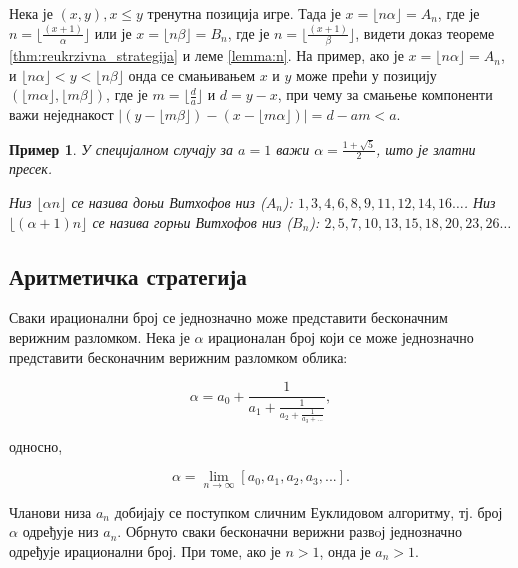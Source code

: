 \documentclass[a4paper]{article}
\newtheorem{example}{Пример}
\begin{document}
Нека је $ (x, y), x \leq y $ тренутна позиција игре. Тада је $ x = \lfloor n \alpha \rfloor = A_{n} $, где је $ n = \lfloor \frac{(x+1)}{\alpha} \rfloor $ или је $ x = \lfloor n \beta \rfloor = B_{n} $, где је $ n = \lfloor \frac{(x+1)}{\beta} \rfloor $, видети доказ теореме \ref{thm:reukrzivna_strategija} и леме \ref{lemma:n}. На пример, ако је $ x = \lfloor n \alpha \rfloor = A_{n} $, и $ \lfloor n \alpha \rfloor < y < \lfloor n \beta \rfloor $ онда се смањивањем $ x $ и $ y $ може прећи у позицију $ (\lfloor m \alpha \rfloor, \lfloor m \beta \rfloor) $, где је $ m = \lfloor \frac{d}{a} \rfloor $ и $ d = y - x $, при чему за смањење компоненти важи неједнакост $ |(y - \lfloor m \beta \rfloor) - (x - \lfloor m \alpha \rfloor)| = d - am < a $.

\begin{example}
	У специјалном случају за $ a = 1 $ важи $ \alpha = \frac{1 + \sqrt{5}}{2} $, што је златни пресек.
	
	Низ $ \lfloor \alpha n \rfloor $ се назива доњи Витхофов низ ($ A_{n} $):
	$ 1, 3, 4, 6, 8, 9, 11, 12, 14, 16 \ldots $. Низ $ \lfloor (\alpha + 1) n \rfloor $ се назива горњи Витхофов низ ($ B_{n} $):
	$ 2, 5, 7, 10, 13, 15, 18, 20, 23, 26 \ldots $
\end{example}

\subsection{Аритметичка стратегија}

Сваки ирационални број се једнозначно може представити бесконачним верижним разломком. Нека је $ \alpha $ ирационалан број који се може једнозначно представити бесконачним верижним разломком облика:

\begin{displaymath}
	\alpha = a_{0} + \frac{1}{a_{1} + \frac{1}{a_{2} + \frac{1}{a_{3} + ...}}},
\end{displaymath}

односно,

\begin{displaymath}
	\alpha = \lim\limits_{n \rightarrow \infty} [a_{0}, a_{1}, a_{2}, a_{3}, ...].
\end{displaymath}

Чланови низа $ a_{n} $ добијају се поступком сличним Еуклидовом алгоритму, тј. број $ \alpha $ одређује низ $ a_{n} $. Обрнуто сваки бесконачни верижни развoј једнозначно одређује ирационални број. При томе, ако је $ n > 1 $, онда је $ a_{n} > 1 $.
\end{document}
